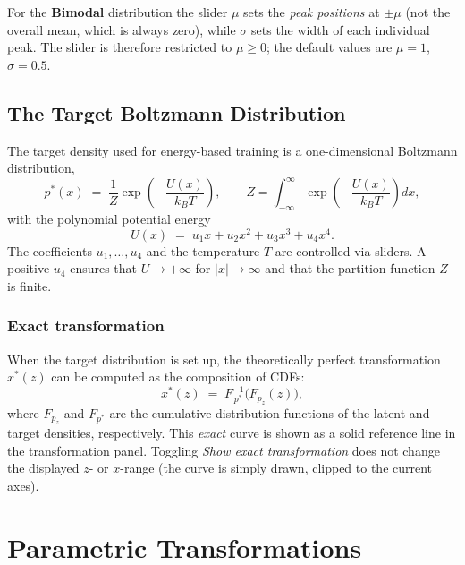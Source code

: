 \documentclass[11pt,a4paper]{article}
\newcommand{\pz}{p_z}
\newcommand{\kT}{k_{\!B}T}
\begin{document}
\noindent
For the \textbf{Bimodal} distribution the slider $\mu$ sets the
\emph{peak positions} at $\pm\mu$ (not the overall mean, which is always
zero), while $\sigma$ sets the width of each individual peak.  The slider
is therefore restricted to $\mu \ge 0$; the default values are $\mu=1$,
$\sigma=0.5$.

\subsection{The Target Boltzmann Distribution}

The target density used for energy-based training is a one-dimensional
Boltzmann distribution,
\begin{equation}
  p^*(x) \;=\; \frac{1}{Z}\exp\!\left(-\frac{U(x)}{\kT}\right),
  \qquad
  Z = \int_{-\infty}^{\infty}\exp\!\left(-\frac{U(x)}{\kT}\right)dx,
\end{equation}
with the polynomial potential energy
\begin{equation}
  U(x) \;=\; u_1 x + u_2 x^2 + u_3 x^3 + u_4 x^4.
\end{equation}
The coefficients $u_1,\ldots,u_4$ and the temperature $T$ are controlled
via sliders.  A positive $u_4$ ensures that $U \to +\infty$ for
$|x|\to\infty$ and that the partition function $Z$ is finite.

\subsubsection*{Exact transformation}

When the target distribution is set up, the theoretically perfect
transformation $x^*(z)$ can be computed as the composition of CDFs:
\begin{equation}
  x^*(z) \;=\; F_{\,p^*}^{-1}\!\bigl(F_{\pz}(z)\bigr),
\end{equation}
where $F_{\pz}$ and $F_{p^*}$ are the cumulative distribution functions of
the latent and target densities, respectively.  This \emph{exact} curve is
shown as a solid reference line in the transformation panel.  Toggling
\emph{Show exact transformation} does not change the displayed $z$- or
$x$-range (the curve is simply drawn, clipped to the current axes).

\section{Parametric Transformations}
\end{document}
